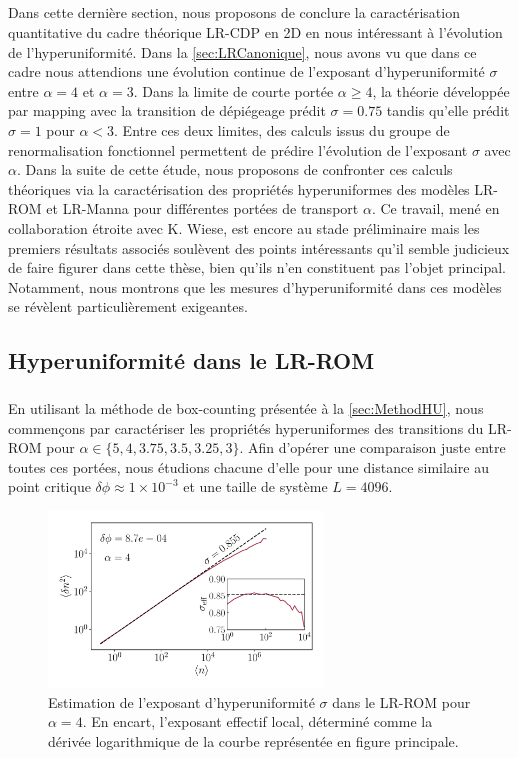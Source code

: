 \subparagraph{}Dans cette dernière section, nous proposons de conclure la caractérisation quantitative du cadre théorique LR-CDP en 2D en nous intéressant à l'évolution de l'hyperuniformité. Dans la \autoref{sec:LRCanonique}, nous avons vu que dans ce cadre nous attendions une évolution continue de l'exposant d'hyperuniformité $\sigma$ entre $\alpha = 4$ et $\alpha=3$. Dans la limite de courte portée $\alpha \geq 4$, la théorie développée par mapping avec la transition de dépiégeage \cite{wiese_hyperuniformity_2024} prédit $\sigma = 0.75$ tandis qu'elle prédit $\sigma = 1$ pour $\alpha < 3$. Entre ces deux limites, des calculs issus du groupe de renormalisation fonctionnel permettent de prédire l'évolution de l'exposant $\sigma$ avec $\alpha$. Dans la suite de cette étude, nous proposons de confronter ces calculs théoriques via la caractérisation des propriétés hyperuniformes des modèles LR-ROM et LR-Manna pour différentes portées de transport $\alpha$. Ce travail, mené en collaboration étroite avec K. Wiese, est encore au stade préliminaire mais les premiers résultats associés soulèvent des points intéressants qu'il semble judicieux de faire figurer dans cette thèse, bien qu'ils n'en constituent pas l'objet principal. Notamment, nous montrons que les mesures d'hyperuniformité dans ces modèles se révèlent particulièrement exigeantes.

\label{sec:HUjumps}

\subsection{Hyperuniformité dans le LR-ROM}

\subparagraph{}En utilisant la méthode de box-counting présentée à la \autoref{sec:MethodHU}, nous commençons par caractériser les propriétés hyperuniformes des transitions du LR-ROM pour $\alpha\in\{ 5, 4, 3.75, 3.5, 3.25, 3 \}$. Afin d'opérer une comparaison juste entre toutes ces portées, nous étudions chacune d'elle pour une distance similaire au point critique $\delta\phi \approx 1\times 10^{-3}$ et une taille de système $L=4096$.

\begin{figure}[h]
	\centering	\includegraphics[width=0.65\textwidth]{Chapitre2/Figures/Hyperuniformity/FigHULRROM.pdf}
	\caption{Estimation de l'exposant d'hyperuniformité $\sigma$ dans le LR-ROM pour $\alpha=4$. En encart, l'exposant effectif local, déterminé comme la dérivée logarithmique de la courbe représentée en figure principale.}
	\label{fig:ExHUJumps}
\end{figure}

